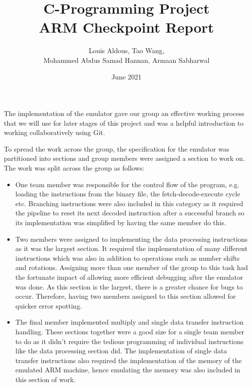 \documentclass{article}
\title{C-Programming Project\\ARM Checkpoint Report}
\author{Louis Aldous, Tao Wang, \\Mohammed Abdus Samad Hannan, Armaan Sabharwal}
\date{June 2021}
\begin{document}
\maketitle

The implementation of the emulator gave our group an effective working process that we will use for later stages of this project and was a helpful introduction to working collaboratively using Git. \par
To spread the work across the group, the specification for the emulator was partitioned into sections and group members were assigned a section to work on. \\
The work was split across the group as follows:
\begin{itemize}
    \item One team member was responsible for the control flow of the program, e.g. loading the instructions from the binary file, the fetch-decode-execute cycle etc. Branching instructions were also included in this category as it required the pipeline to reset its next decoded instruction after a successful branch so its implementation was simplified by having the same member do this. 
    \item Two members were assigned to implementing the data processing instructions as it was the largest section. It required the implementation of many different instructions which was also in addition to operations such as number shifts and rotations. Assigning more than one member of the group to this task had the fortunate impact of allowing more efficient debugging after the emulator was done. As this section is the largest, there is a greater chance for bugs to occur. Therefore, having two members assigned to this section allowed for quicker error spotting.
    \item The final member implemented multiply and single data transfer instruction handling. These sections together were a good size for a single team member to do as it didn't require the tedious programming of individual instructions like the data processing section did. The implementation of single data transfer instructions also required the implementation of the memory of the emulated ARM machine, hence emulating the memory was also included in this section of work.\par
\end{itemize}
\end{document}
